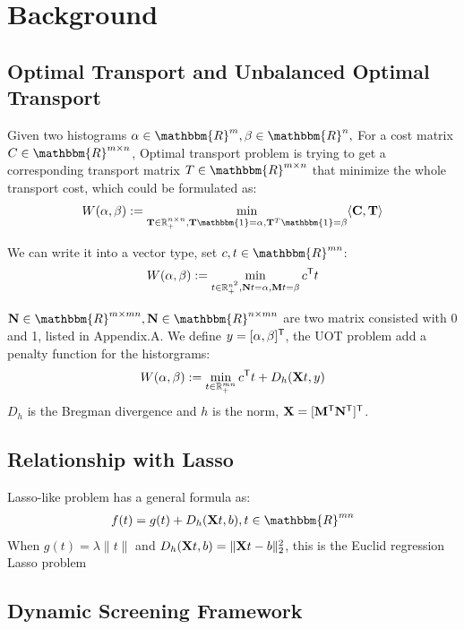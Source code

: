 \section{Background}
\subsection{Optimal Transport and Unbalanced Optimal Transport}
Given two histograms $\alpha \in \mathbbm{R}^{m}, \beta \in \mathbbm{R}^{n},$ For a cost matrix $C \in \mathbbm{R}^{m \times n}$, Optimal transport problem is trying to get a corresponding transport matrix $T \in \mathbbm{R}^{m \times n}$ that minimize the whole transport cost, which could be formulated as:
$$
\begin{aligned}
W(\alpha,\beta) := \min_{ \mathbf{T} \in \mathbb{R}_{+}^{n \times n},\mathbf{T} \mathbbm{1} = \alpha, \mathbf{T}^{T}\mathbbm{1} = \beta} \langle \C, \mathbf{T} \rangle 
\end{aligned}
$$

We can write it into a vector type, set $c,t \in \mathbbm{R}^{mn}$:
$$
\begin{aligned}
W(\alpha,\beta) := \min_{t \in \mathbb{R}_{+}^{n^2}, \mathbf{N}t = \alpha, \mathbf{M}t = \beta} c^{\mathsf T}t 
\end{aligned}
$$

$\mathbf{N} \in \mathbbm{R}^{m \times mn}, \mathbf{N} \in \mathbbm{R}^{n \times mn}$ are two matrix consisted with 0 and 1, listed in Appendix.A. We define $y = [\alpha, \beta]^{\mathsf T}$, the UOT problem add a penalty function for the historgrams: 
\begin{equation}
\label{eq:uot}
W(\alpha,\beta) := \min_{t \in \mathbb{R}_{+}^{mn}} c^{\mathsf T}t + D_h(\mathbf{X}t,y)
\end{equation}
$D_h$ is the Bregman divergence and $h$ is the norm, $\mathbf{X} = [\mathbf{M}^{\mathsf T} \mathbf{N}^{\mathsf T}]^{\mathsf T}$.

\subsection{Relationship with Lasso}
Lasso-like problem has a general formula as:
$$
\begin{aligned}
f(t) = g(t) + D_h(\X t,b), t\in \mathbbm{R}^{mn}
\end{aligned}
$$
When $g(t) = \lambda \|t\|$ and $D_h(\mathbf{X} t,b) = \|\mathbf{X} t-b\|_2^2$, this is the Euclid regression Lasso problem


\subsection{Dynamic Screening Framework}

